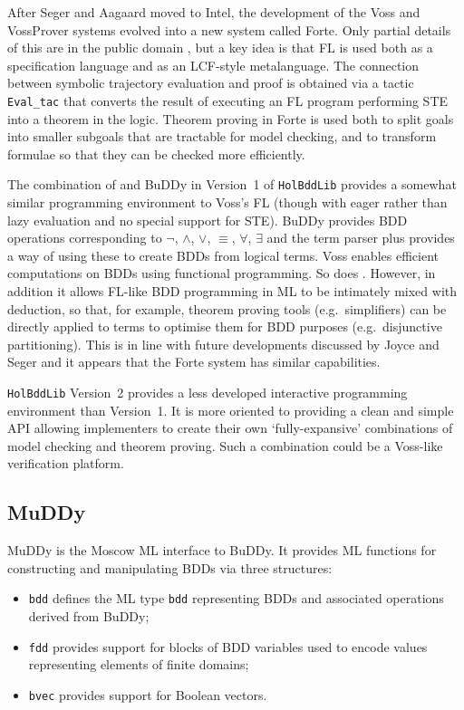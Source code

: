 \documentclass[12pt,fleqn]{book}
\renewcommand{\t}[1]{\mbox{\tt #1}}
\newcommand{\Buddy}{BuDDy{}}
\newcommand{\Muddy}{MuDDy{}}
\begin{document}
After Seger and Aagaard moved to Intel, the development of the Voss and
VossProver systems evolved into a new system called Forte.  Only partial details
of this are in the public domain
\cite{oleary-itj-99,aagaard-tphols-99}, but a key idea is that FL is
used both as a specification language and as an LCF-style
metalanguage. The connection between symbolic trajectory evaluation
and proof is obtained via a tactic {\tt{Eval\_tac}} that converts the
result of executing an FL program performing STE into a theorem in the
logic. Theorem proving in Forte is used both to split goals into
smaller subgoals that are tractable for model checking, and to
transform formulae so that they can be checked more efficiently.

The combination of \HOL{} and \Buddy{} in Version~1 of
{\tt{HolBddLib}} provides a somewhat similar programming environment
to Voss's FL (though with eager rather than lazy evaluation and no
special support for STE). \Buddy{} provides BDD operations
corresponding to $\neg$, $\wedge$, $\vee$, $\equiv$, $\forall$,
$\exists$ and the \HOL{} term parser plus  provides a
way of using these to create BDDs from logical terms.  Voss enables
efficient computations on BDDs using functional programming. So does
. However, in addition it allows FL-like BDD programming
in ML to be intimately mixed with \HOL{} deduction, so that, for
example, theorem proving tools (e.g.~simplifiers) can be directly
applied to terms to optimise them for BDD purposes (e.g.~disjunctive
partitioning).  This is in line with future developments discussed by
Joyce and Seger \cite{JoyceSeger} and it appears that the Forte system
has similar capabilities.

{\tt{HolBddLib}} Version~2 provides a less developed interactive
programming environment than Version~1. It is more oriented to
providing a clean and simple API allowing implementers to create their
own `fully-expansive' combinations of model checking and theorem
proving. Such a combination could be a Voss-like verification
platform.



\subsection{\Muddy}\label{muddy}

\Muddy{} is the Moscow ML interface to \Buddy{}. It provides ML functions for constructing and
manipulating BDDs via three structures:

\begin{itemize}

\item \t{bdd} defines the ML type
\t{bdd} representing BDDs and associated operations derived from \Buddy{};


\item \t{fdd} provides support for blocks of BDD variables
used to encode values representing elements of finite domains;

\item \t{bvec} provides support for Boolean vectors.

\end{itemize}
\end{document}
